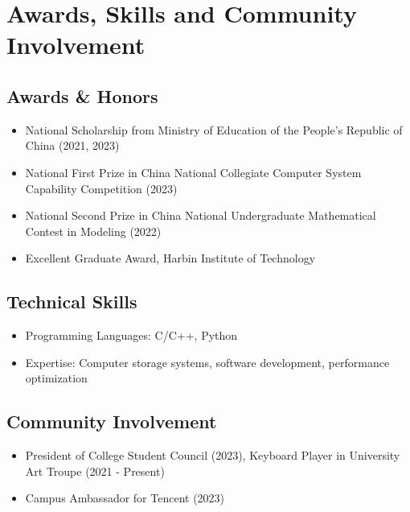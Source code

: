 \section{Awards, Skills and Community Involvement}
\subsection*{Awards \& Honors}
\begin{itemize}[parsep=0.1ex]
  \item National Scholarship from Ministry of Education of the People's Republic of China (2021, 2023)
  \item National First Prize in China National Collegiate Computer System Capability Competition (2023)
  \item National Second Prize in China National Undergraduate Mathematical Contest in Modeling (2022)
  \item Excellent Graduate Award, Harbin Institute of Technology
\end{itemize}

\subsection*{Technical Skills}
\begin{itemize}[parsep=0.1ex]
  \item Programming Languages: C/C++, Python
  \item Expertise: Computer storage systems, software development, performance optimization
\end{itemize}

\subsection*{Community Involvement}
\begin{itemize}[parsep=0.1ex]
  \item President of College Student Council (2023), Keyboard Player in University Art Troupe (2021 - Present)
  \item Campus Ambassador for Tencent (2023)
\end{itemize}
